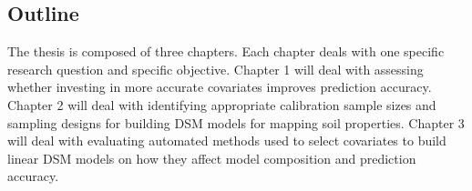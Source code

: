 \subsection{Outline}

The thesis is composed of three chapters. Each chapter deals with one specific 
research question and specific objective. Chapter 1 will deal with assessing 
whether investing in more accurate covariates improves prediction accuracy. 
Chapter 2 will deal with identifying appropriate calibration sample sizes and 
sampling designs for building DSM models for mapping soil properties. Chapter 3 
will deal with evaluating automated methods used to select covariates to build 
linear DSM models on how they affect model composition and prediction accuracy.